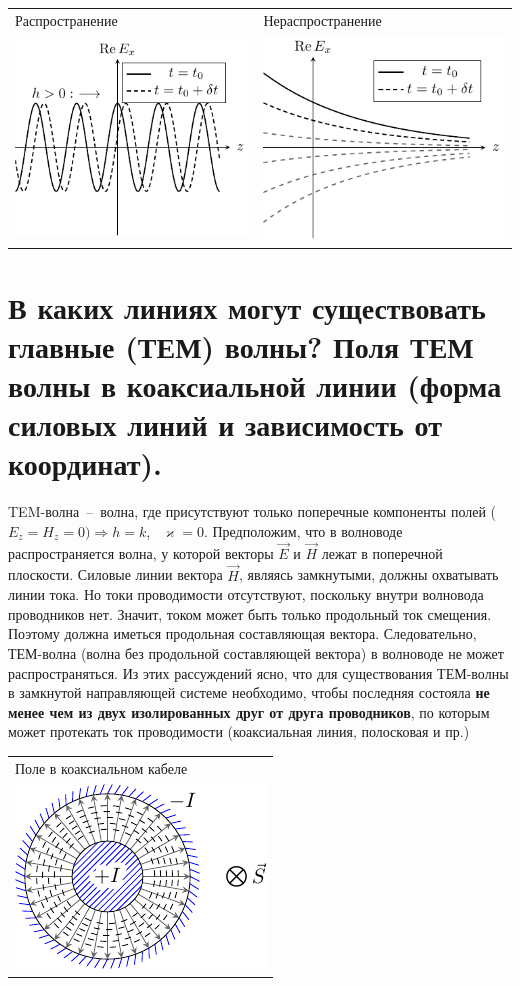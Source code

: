 \begin{multicols*}{2}
		\begin{tabular}{l l}
			{Распространение} & {Нераспространение} \\
			\includegraphics[width=0.25\linewidth]{aed_imgs/lect3_ris1} &
			\includegraphics[width=0.25\linewidth]{aed_imgs/lect3_ris2} \\
		\end{tabular}
		
		\section{В каких линиях могут существовать главные (ТЕМ) волны? Поля ТЕМ волны в коаксиальной линии (форма силовых линий и зависимость от координат).}
		
		TEM-волна~--~волна, где присутствуют только поперечные компоненты полей ($E_z = H_z = 0) \Rightarrow h = k$,~ $\varkappa = 0$. Предположим, что в волноводе распространяется волна, у которой векторы $\vec{E}$ и $\vec{H}$ лежат в поперечной плоскости. Силовые линии вектора $\vec{H}$, являясь замкнутыми, должны охватывать линии тока. Но токи проводимости отсутствуют, поскольку внутри волновода проводников нет. Значит, током может быть только продольный ток смещения. Поэтому должна иметься продольная составляющая вектора. Следовательно, ТЕМ-волна (волна без продольной составляющей вектора) в волноводе не может распространяться. Из этих рассуждений ясно, что для существования ТЕМ-волны в замкнутой направляющей системе необходимо, чтобы последняя состояла \textbf{не менее чем из двух изолированных друг от друга проводников}, по которым может протекать ток проводимости (коаксиальная линия, полосковая и пр.)\\
		\begin{tabular}{l}
			{Поле в коаксиальном кабеле} \\
			\includegraphics[width=0.25\linewidth]{aed_imgs/lect4_ris6} \\
		\end{tabular}
		

\end{multicols*}
